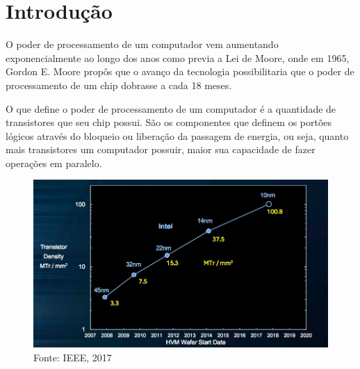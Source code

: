 \documentclass[
	12pt,				%
	oneside,			%
	a4paper,			%
	english,			%
	french,				%
	spanish,			%
	brazil,				%
	]{abntex2}
\begin{document}
\frenchspacing 


\imprimircapa

\imprimirfolhaderosto

\tableofcontents*
\cleardoublepage


\textual

\chapter*[Introdução]{Introdução}

O poder de processamento de um computador vem aumentando exponencialmente ao longo dos anos como previa a Lei de Moore, onde em 1965, Gordon E. Moore propôs que o avanço da tecnologia possibilitaria que o poder de processamento de um chip dobrasse a cada 18 meses.

O que define o poder de processamento de um computador é a quantidade de transistores que seu chip possui. São os componentes que definem os portões lógicos através do bloqueio ou liberação da passagem de energia, ou seja, quanto mais transistores um computador possuir, maior sua capacidade de fazer operações em paralelo. 

\begin{figure}[h!]
	\includegraphics[width=\linewidth]{transistor.jpg}
	\caption{Fonte: IEEE, 2017}
	\label{fig:graph1}
\end{figure}
\end{document}
